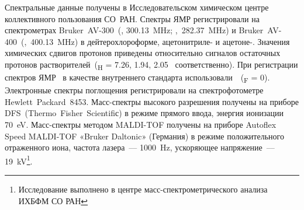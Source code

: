 Спектральные данные получены в Исследовательском химическом центре коллективного пользования СО~РАН.
Спектры ЯМР регистрировали на спектрометрах Bruker~AV-300~(, \SI{300.13}{\mega\hertz}; ,~\SI{282.37}{\mega\hertz}) и Bruker~AV-400~(,~\SI{400.13}{\mega\hertz}) в дейтерохлороформе, \mbox{ацетонитриле-} и \mbox{ацетоне-}.
Значения химических сдвигов протонов приведены относительно сигналов остаточных протонов растворителей~(\chemdelta{}\textsubscript{H} = 7.26, 1.94, 2.05 \si{\ppm соответственно}).
При регистрации спектров ЯМР~ в качестве внутреннего стандарта использовали~~(\chemdelta{}\textsubscript{F} = \SI{0}{\ppm}).
Электронные спектры поглощения регистрировали на спектрофотометре Hewlett~Packard~8453.
Масс-спектры высокого разрешения получены на приборе DFS~(Thermo~Fisher~Scientifiс) в режиме прямого ввода, энергия ионизации \SI{70}{\electronvolt}.
Масс-спектры методом  MALDI-TOF получены на приборе Autoflex Speed MALDI-TOF «Bruker Daltonic» (Германия) в режиме положительного отраженного иона, частота лазера~–-- \SI{1000}{\hertz}, ускоряющее напряжение~–-- \SI{19}{\kilo\volt}\footnote{Исследование выполнено в центре масс-спектрометрического анализа ИХБФМ СО РАН}.



